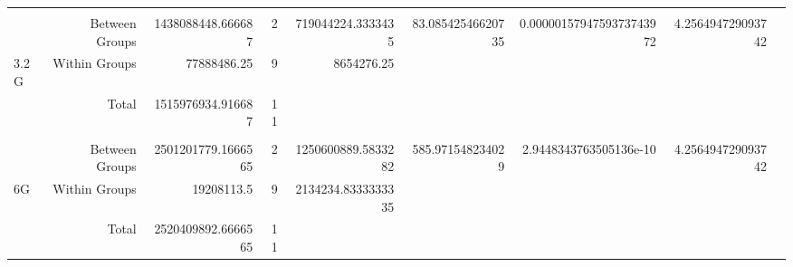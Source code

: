 \begin{landscape}
\begin{table}[!htp]
\begin{tabular}{lrrrrrrrr}
& & & & & & & \\
&Between Groups &1438088448.666687 &2 &719044224.3333435 &83.08542546620735 &0.0000015794759373743972 &4.256494729093742 \\
3.2G &Within Groups &77888486.25 &9 &8654276.25 & & & \\
&Total &1515976934.916687 &11 & & & & \\
& & & & & & & \\
&Between Groups &2501201779.1666565 &2 &1250600889.5833282 &585.971548234029 &2.9448343763505136e-10 &4.256494729093742 \\
6G &Within Groups &19208113.5 &9 &2134234.8333333335 & & & \\
&Total &2520409892.6666565 &11 & & & & \\
\bottomrule
\end{tabular}
\end{table}
\end{landscape}


